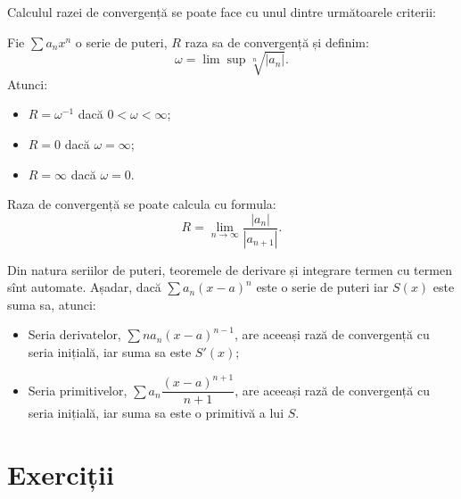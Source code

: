 Calculul razei de convergență se poate face cu unul dintre următoarele criterii:

\begin{theorem}\label{thm:c-h-raza}
  Fie $ \sum a_n x^n $ o serie de puteri, $ R $ raza sa de
  convergență și definim:
  \[
    \omega = \lim \sup \sqrt[n]{|a_n|}.
  \]
  Atunci:
  \begin{itemize}
  \item $ R = \omega^{-1} $ dacă $ 0 < \omega < \infty $;
  \item $ R = 0 $ dacă $ \omega = \infty $;
  \item $ R = \infty $ dacă $ \omega = 0 $.
  \end{itemize}
\end{theorem}

\begin{theorem}\label{thm:raport-raza}
  Raza de convergență se poate calcula cu formula:
  \[
    R = \lim_{n \to \infty} \frac{|a_n|}{|a_{n+1}|}.
  \]
\end{theorem}

\begin{remark}\label{rk:transfer-puteri}
  Din natura seriilor de puteri, teoremele de derivare și integrare termen
  cu termen sînt automate. Așadar, dacă $ \sum a_n (x - a)^n $ este o
  serie de puteri iar $ S(x) $ este suma sa, atunci:
  \begin{itemize}
  \item Seria derivatelor, $ \sum na_n(x - a)^{n-1} $, are aceeași rază de
    convergență cu seria inițială, iar suma sa este $ S'(x) $;
  \item Seria primitivelor, $ \sum a_n \dfrac{(x - a)^{n+1}}{n+1} $,
    are aceeași rază de convergență cu seria inițială, iar suma sa este o
    primitivă a lui $ S $.
  \end{itemize}
\end{remark}


\section{Exerciții}

